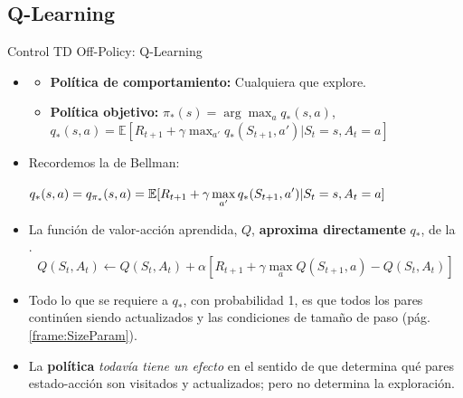 \documentclass[10pt, envcountsect, handout, aspectratio=1610, hyperref={hypertexnames=true}]{beamer}
\begin{document}

\subsection{Q-Learning}



\begin{frame}{Control TD Off-Policy: Q-Learning}{\citep{watkins1989learning}}


\begin{itemize}
	\item {}
		\begin{itemize}
			\item \textbf{Política de comportamiento:}  Cualquiera que explore.
			\item \textbf{Política objetivo:} $\pi_*(s)=\arg\max_a q_*(s,a)$, $q_*(s, a) = \mathbb{E}[R_{t+1} + \gamma \max_{a'} q_*(S_{t+1}, a') | S_t = s, A_t = a]$
		\end{itemize} 
		
	\item Recordemos la  de Bellman:
	
	\centerline{$\displaystyle q_*(s,a)= q_{\pi_*}(s,a) = \mathbb{E}[R_{t+1}+ \gamma \max_{a'} q_* (S_{t+1}, a') |S_t=s, A_t=a] $}
	
	\item La función de valor-acción aprendida, $Q$, \textbf{aproxima directamente} $q_*$, 
	 de la .
\[
Q(S_t, A_t) \gets Q(S_t, A_t) + \alpha \left[ R_{t+1} + \gamma \max_a Q(S_{t+1}, a) - Q(S_t, A_t) \right]
\]

	
	\item Todo lo que se requiere  a $q_*$, con probabilidad 1,  es que todos los pares continúen siendo actualizados y las condiciones de tamaño de paso (pág. \ref{frame:SizeParam}). 

	\item La \textbf{política} \textit{todavía tiene un efecto} en el sentido de que determina qué pares estado-acción son visitados y actualizados; pero no determina la exploración.

\end{itemize}
	
\end{frame}
\end{document}
